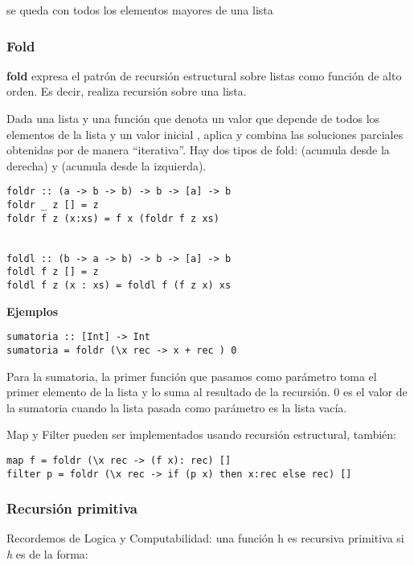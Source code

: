 se queda con todos los elementos mayores de una lista

\subsubsection{Fold}
\textbf{fold} expresa el patrón de recursión estructural sobre listas como función de alto orden. Es decir, realiza recursión sobre una lista.

Dada una lista  y una función  que denota un valor que depende de todos los elementos de la lista  y un valor inicial , aplica y combina las soluciones parciales obtenidas por  de manera  ``iterativa''. 
Hay dos tipos de fold:  (acumula desde la derecha) y  (acumula desde la izquierda).

\begin{centrado}
	\begin{verbatim}
foldr :: (a -> b -> b) -> b -> [a] -> b
foldr _ z [] = z
foldr f z (x:xs) = f x (foldr f z xs)
		
		
foldl :: (b -> a -> b) -> b -> [a] -> b
foldl f z [] = z
foldl f z (x : xs) = foldl f (f z x) xs
	\end{verbatim}
\end{centrado}

\textbf{Ejemplos}
\begin{centrado}
	\begin{verbatim}
sumatoria :: [Int] -> Int
sumatoria = foldr (\x rec -> x + rec ) 0
	\end{verbatim}
\end{centrado}
Para la sumatoria, la primer función que pasamos como parámetro toma el primer elemento de la lista y lo suma al resultado de la recursión. $0$ es el valor de la sumatoria cuando la lista pasada como parámetro es la lista vacía.

Map y Filter pueden ser implementados usando recursión estructural, también:
\begin{centrado}
	\begin{verbatim}
map f = foldr (\x rec -> (f x): rec) []
filter p = foldr (\x rec -> if (p x) then x:rec else rec) []
	\end{verbatim}
\end{centrado}


\subsubsection{Recursión primitiva}
Recordemos de Logica y Computabilidad: una función h es recursiva primitiva si \textit{h} es de la forma:


